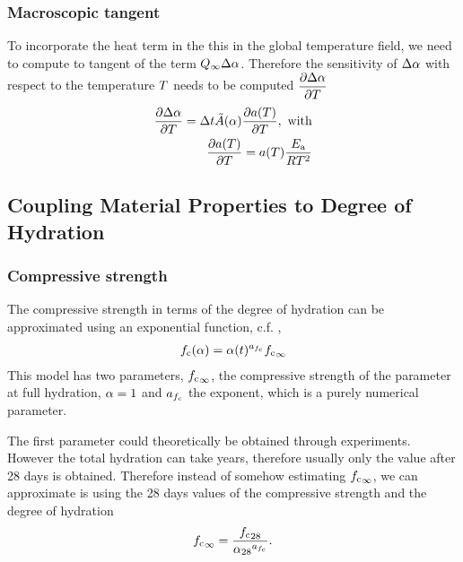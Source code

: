 \subsubsection{Macroscopic tangent}
To incorporate the heat term in the this in the global temperature field, we need to compute to tangent of the term $Q_{\infty}\Delta\alpha$.
Therefore the sensitivity of $\Delta\alpha$ with respect to the temperature $T$ needs to be computed $\dfrac{\partial \Delta\alpha}{\partial T}$
\begin{align}
	\dfrac{\partial \Delta\alpha}{\partial T} = \Delta t \tilde{A}(\alpha)\dfrac{\partial a(T)}{\partial T},\text{ with}\\
	\dfrac{\partial a(T)}{\partial T} = a(T) \frac{E_{\text{a}}}{RT^2}
\end{align}

\subsection{Coupling Material Properties to Degree of Hydration} \label{appendix:fem_evolution}
\subsubsection{Compressive strength}
The compressive strength in terms of the degree of hydration can be approximated using an exponential function, c.f. \cite{car_2016_mamt},
\begin{align}
	f_{\text{c}}(\alpha) = \alpha(t)^{a_{f_{\text{c}}}} {f_{\text{c}}}_\infty \label{eq:fcwrtDOH}
\end{align}
This model has two parameters, ${f_{\text{c}}}_\infty$, the compressive strength of the parameter at full hydration, $\alpha = 1$ and $a_{f_{\text{c}}}$ the exponent, which is a purely numerical parameter.

The first parameter could theoretically be obtained through experiments.
However the total hydration can take years, therefore usually only the value after 28 days is obtained.
Therefore instead of somehow estimating ${f_{\text{c}}}_\infty$, we can approximate is using the 28 days values of the compressive strength and the degree of hydration
\begin{align}
{f_{\text{c}}}_\infty = 	\dfrac{{f_{\text{c}}}_{28}}{{\alpha_{28}}^{a_{f_{\text{c}}}}}.
\end{align}
